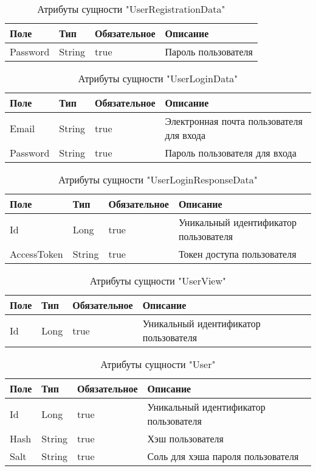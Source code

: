 \begin{xltabular}{\textwidth}{|l|l|p{1.7cm}|X|}
    \caption{Атрибуты сущности "UserRegistrationData"}\\ \hline
    Поле & Тип & Обяза\-тельное & Описание \\ \hline
    Password & String & true & Пароль пользователя \\ \hline
\end{xltabular}

\begin{xltabular}{\textwidth}{|l|l|p{1.7cm}|X|}
    \caption{Атрибуты сущности "UserLoginData"}\\ \hline
    Поле & Тип & Обяза\-тельное & Описание \\ \hline
    Email & String & true & Электронная почта пользователя для входа \\ \hline
    Password & String & true & Пароль пользователя для входа \\ \hline
\end{xltabular}

\begin{xltabular}{\textwidth}{|l|l|p{1.7cm}|X|}
    \caption{Атрибуты сущности "UserLoginResponseData"}\\ \hline
    Поле & Тип & Обяза\-тельное & Описание \\ \hline
    Id & Long & true & Уникальный идентификатор пользователя \\ \hline
    AccessToken & String & true & Токен доступа пользователя \\ \hline
\end{xltabular}

\begin{xltabular}{\textwidth}{|l|l|p{1.7cm}|X|}
    \caption{Атрибуты сущности "UserView"}\\ \hline
    Поле & Тип & Обяза\-тельное & Описание \\ \hline
    Id & Long & true & Уникальный идентификатор пользователя \\ \hline
\end{xltabular}

\begin{xltabular}{\textwidth}{|l|l|p{1.7cm}|X|}
    \caption{Атрибуты сущности "User"}\\ \hline
    Поле & Тип & Обяза\-тельное & Описание \\ \hline
    Id & Long & true & Уникальный идентификатор пользователя \\ \hline
    Hash & String & true & Хэш пользователя \\ \hline
    Salt & String & true & Соль для хэша пароля пользователя \\ \hline
\end{xltabular}

